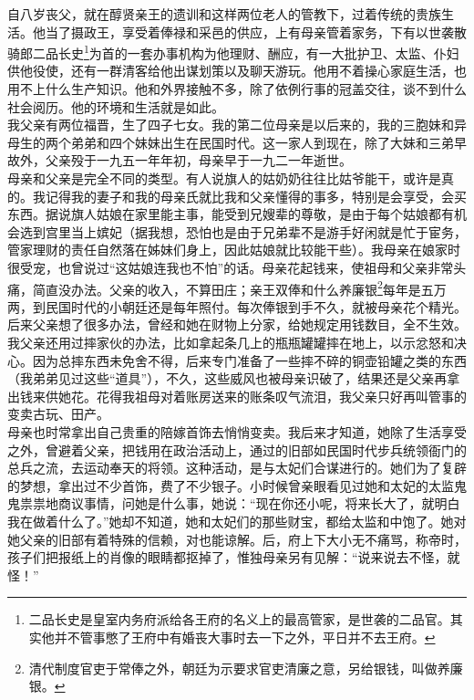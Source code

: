 自八岁丧父，就在醇贤亲王的遗训和这样两位老人的管教下，过着传统的贵族生活。他当了摄政王，享受着俸禄和采邑的供应，上有母亲管着家务，下有以世袭散骑郎二品长史\footnote{二品长史是皇室内务府派给各王府的名义上的最高管家，是世袭的二品官。其实他并不管事憋了王府中有婚丧大事时去一下之外，平日并不去王府。}为首的一套办事机构为他理财、酬应，有一大批护卫、太监、仆妇供他役使，还有一群清客给他出谋划策以及聊天游玩。他用不着操心家庭生活，也用不上什么生产知识。他和外界接触不多，除了依例行事的冠盖交往，谈不到什么社会阅历。他的环境和生活就是如此。\\

我父亲有两位福晋，生了四子七女。我的第二位母亲是以后来的，我的三胞妹和异母生的两个弟弟和四个妹妹出生在民国时代。这一家人到现在，除了大妹和三弟早故外，父亲殁于一九五一年年初，母亲早于一九二一年逝世。\\

母亲和父亲是完全不同的类型。有人说旗人的姑奶奶往往比姑爷能干，或许是真的。我记得我的妻子和我的母亲氏就比我和父亲懂得的事多，特别是会享受，会买东西。据说旗人姑娘在家里能主事，能受到兄嫂辈的尊敬，是由于每个姑娘都有机会选到宫里当上嫔妃（据我想，恐怕也是由于兄弟辈不是游手好闲就是忙于宦务，管家理财的责任自然落在姊妹们身上，因此姑娘就比较能干些）。我母亲在娘家时很受宠，也曾说过“这姑娘连我也不怕”的话。母亲花起钱来，使祖母和父亲非常头痛，简直没办法。父亲的收入，不算田庄；亲王双俸和什么养廉银\footnote{清代制度官吏于常俸之外，朝廷为示要求官吏清廉之意，另给银钱，叫做养廉银。}每年是五万两，到民国时代的小朝廷还是每年照付。每次俸银到手不久，就被母亲花个精光。后来父亲想了很多办法，曾经和她在财物上分家，给她规定用钱数目，全不生效。我父亲还用过摔家伙的办法，比如拿起条几上的瓶瓶罐罐摔在地上，以示忿怒和决心。因为总摔东西未免舍不得，后来专门准备了一些摔不碎的铜壶铅罐之类的东西（我弟弟见过这些“道具”），不久，这些威风也被母亲识破了，结果还是父亲再拿出钱来供她花。花得我祖母对着账房送来的账条叹气流泪，我父亲只好再叫管事的变卖古玩、田产。\\

母亲也时常拿出自己贵重的陪嫁首饰去悄悄变卖。我后来才知道，她除了生活享受之外，曾避着父亲，把钱用在政治活动上，通过的旧部如民国时代步兵统领衙门的总兵之流，去运动奉天的将领。这种活动，是与太妃们合谋进行的。她们为了复辟的梦想，拿出过不少首饰，费了不少银子。小时候曾亲眼看见过她和太妃的太监鬼鬼祟祟地商议事情，问她是什么事，她说：“现在你还小呢，将来长大了，就明白我在做着什么了。”她却不知道，她和太妃们的那些财宝，都给太监和中饱了。她对她父亲的旧部有着特殊的信赖，对也能谅解。后，府上下大小无不痛骂，称帝时，孩子们把报纸上的肖像的眼睛都抠掉了，惟独母亲另有见解：“说来说去不怪，就怪！”\\

